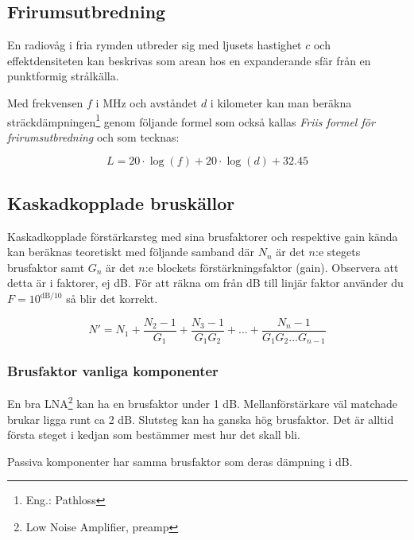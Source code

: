 \documentclass[12pt,swedish,a4paper]{article}
\begin{document}
\subsection{Frirumsutbredning}

En radiovåg i fria rymden utbreder sig med ljusets hastighet $c$ och effektdensiteten kan beskrivas som arean hos en expanderande sfär från en punktformig strålkälla.

Med frekvensen $f$ i MHz och avståndet $d$ i kilometer kan man beräkna sträck\-dämp\-ning\-en\footnote{Eng.: Pathloss} genom följande formel som också kallas \emph{Friis formel för frirumsutbredning} och som tecknas:

\begin{equation}
L=20\cdot \log(f) + 20\cdot \log(d) +32.45
\end{equation}

\subsection{Kaskadkopplade bruskällor}

Kaskadkopplade förstärkarsteg med sina brusfaktorer och respektive gain kända kan beräknas teoretiskt med följande samband där $N_n$ är det $n$:e stegets brusfaktor samt $G_n$ är det $n$:e blockets förstärkningsfaktor (gain). Observera att detta är i faktorer, ej dB. För att räkna om från dB till linjär faktor använder du $F=10^{\mathrm{dB}/10}$ så blir det korrekt.

\begin{equation}
N'=N_1+\frac{N_2-1}{G_1} + \frac{N_3-1}{G_1G_2} + ... + \frac{N_n-1}{G_1G_2...G_{n-1}}
\end{equation}

\subsubsection{Brusfaktor vanliga komponenter}

En bra LNA\footnote{Low Noise Amplifier, preamp} kan ha en brusfaktor under 1 dB. Mellanförstärkare väl matchade brukar ligga runt ca 2 dB. Slutsteg kan ha ganska hög brusfaktor. Det är alltid första steget i kedjan som bestämmer mest hur det skall bli.

Passiva komponenter har samma brusfaktor som deras dämpning i dB.
\end{document}
